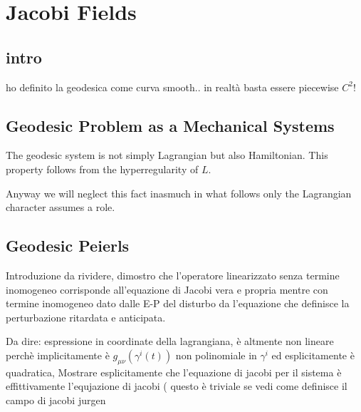 \documentclass[Main]{subfiles}
\begin{document}
\chapter{Jacobi Fields}
\section{intro}
	ho definito la geodesica come curva smooth.. in realtà basta essere piecewise $C^2$!
	
\section{Geodesic Problem as a Mechanical Systems}
	\begin{observation}
		The geodesic system is not simply Lagrangian but also Hamiltonian.
		This property follows from the hyperregularity\cite{Abraham1978} of $L$.
		
		\begin{Warning}
		Anyway we will neglect this fact inasmuch in what follows only the Lagrangian character assumes a role.
		\end{Warning}
	\end{observation}
\section{Geodesic Peierls}
	
	\begin{Warning}
	Introduzione da rividere, dimostro che l'operatore linearizzato senza termine inomogeneo corrisponde all'equazione di Jacobi vera e propria mentre con termine inomogeneo dato dalle E-P del disturbo da l'equazione che definisce la perturbazione ritardata e anticipata.
	\end{Warning}

	\begin{Warning}
		Da dire: espressione in coordinate della lagrangiana, è altmente non lineare perchè implicitamente è $g_{\mu\nu}(\gamma^i(t))$ non polinomiale in $\gamma^i$ ed esplicitamente è quadratica, Mostrare esplicitamente che l'equazione di jacobi per il sistema è effittivamente l'equjazione di jacobi ( questo è triviale se vedi come definisce il campo di jacobi jurgen 
	\end{Warning}	
	
\end{document}
